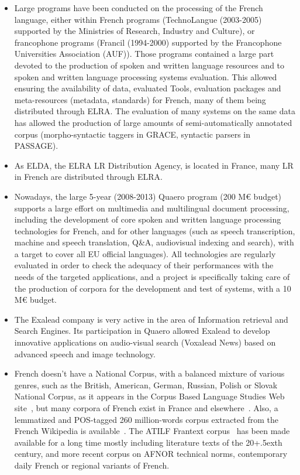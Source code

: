 \begin{multicols}{2}
\begin{itemize}
\item Large programs have been conducted on the processing of the French
language, either within French programs (TechnoLangue (2003-2005)
supported by the Ministries of Research, Industry and Culture), or
francophone programs (Francil (1994-2000) supported by the Francophone
Universities Association (AUF)). Those programs contained a large part
devoted to the production of spoken and written language resources and
to spoken and written language processing systems evaluation. This
allowed ensuring the availability of data, evaluated Tools, evaluation
packages and meta-resources (metadata, standards) for French, many of
them being distributed through ELRA. The evaluation of many systems on
the same data has allowed the production of large amounts of
semi-automatically annotated corpus (morpho-syntactic taggers in GRACE,
syntactic parsers in PASSAGE).

\item As ELDA, the ELRA LR Distribution Agency, is located in France, many
LR in French are distributed through ELRA.

\item Nowadays, the large 5-year (2008-2013) Quaero program (200 M€
  budget) supports a large effort on multimedia and multilingual
  document processing, including the development of core spoken and
  written language processing technologies for French, and for other
  languages (such as speech transcription, machine and speech
  translation, Q\&A, audiovisual indexing and search), with a target
  to cover all EU official languages). All technologies are regularly
  evaluated in order to check the adequacy of their performances with
  the needs of the targeted applications, and a project is
  specifically taking care of the production of corpora for the
  development and test of systems, with a 10 M€ budget.

\item The Exalead company is very active in the area of Information
retrieval and Search Engines. Its participation in Quaero allowed
Exalead to develop innovative applications on audio-visual search
(Voxalead News) based on advanced speech and image technology.

\item French doesn’t have a National Corpus, with a balanced mixture of
various genres, such as the British, American, German, Russian, Polish
or Slovak National Corpus, as it appears in the Corpus Based Language
Studies Web site~\cite{corpuslangstud}, but many corpora of French exist in France and
elsewhere~\cite{corpusfr}. Also, a lemmatized and POS-tagged 260 million-words
corpus extracted from the French Wikipedia is available~\cite{wikipediafr}. The ATILF
Frantext corpus~\cite{atilf} has been made available for a long time mostly
including literature texts of the 20\raise+.5ex\hbox{th} century, and more recent corpus
on AFNOR technical norms, contemporary daily French or regional
variants of French.


\end{itemize}
\end{multicols}
